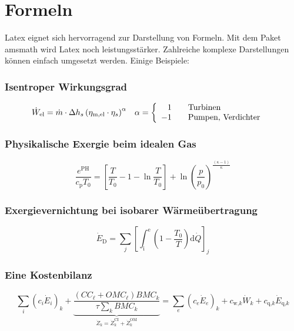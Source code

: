 \section{Formeln}
\label{sec:formeln}
Latex eignet sich hervorragend zur Darstellung von Formeln. Mit dem Paket amsmath wird Latex noch leistungsstärker. Zahlreiche komplexe Darstellungen können einfach umgesetzt werden. Einige Beispiele:

\subsubsection{Isentroper Wirkungsgrad}
\begin{align}
\dot W_\text{el} &= \dot m \cdot \Delta h_s \left(\eta_\text{m,el} \cdot \eta_s\right)^\alpha &
\alpha &= \left\{
\begin{array}{r l}
1 & \quad \text{Turbinen}\\
-1 & \quad \text{Pumpen, Verdichter}
\end{array}
\right.
\end{align}

\subsubsection{Physikalische Exergie beim  idealen Gas}
\begin{equation}
\frac{e^\text{PH}}{c_\text{p}T_0}=\left[\frac{T}{T_0}-1-\ln\frac{T}{T_0}\right]+\ln\left(\frac{p}{p_0}\right)^{\frac{\left(\kappa-1\right)}{\kappa}}
\end{equation}

\subsubsection{Exergievernichtung bei isobarer Wärmeübertragung}
\begin{equation}
\dot E_\text{D}=\sum\limits_j\left[\int_\text{i}^\text{e}\left(1-\frac{T_0}{T}\right)\text{d}\dot Q\right]_j	
\label{eq:ed_he}
\end{equation}

\subsubsection{Eine Kostenbilanz}
\begin{equation}
\sum_i{\left(c_i\dot E_i\right)_k} + \underbrace{\frac{\left(CC_\ell+OMC_\ell\right) BMC_k}{\tau \sum_k{BMC_k}}}_{\dot Z_k=\dot Z_k^\text{CI}+\dot Z_k^\text{OM}}
=\sum_e{\left(c_e\dot E_e\right)_k} + c_{\text{w,}k} \dot W_k + c_{\text{q,}k}\dot E_{\text{q,}k}
\label{eq:cost_balance}
\end{equation}

